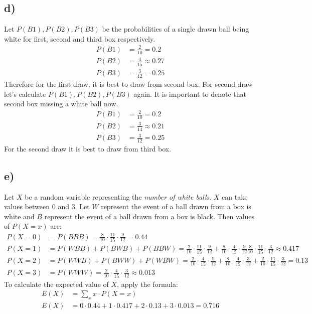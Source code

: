 \documentclass[12pt]{article}
\begin{document}
\subsection*{d)}
Let $P(B1), P(B2), P(B3)$ be the probabilities of a single drawn ball being white for first, second and third box respectively.
\begin{align*}
    P(B1) &= \frac{2}{10} = 0.2\\
    P(B2) &= \frac{4}{15} \approx 0.27\\
    P(B3) &= \frac{3}{12} = 0.25
\end{align*}
Therefore for the first draw, it is best to draw from second box. For second draw let's calculate $P(B1), P(B2), P(B3)$ again. It is important to denote that second box missing a white ball now.
\begin{align*}
    P(B1) &= \frac{2}{10} = 0.2\\
    P(B2) &= \frac{3}{14} \approx 0.21\\
    P(B3) &= \frac{3}{12} = 0.25
\end{align*}
For the second draw it is best to draw from third box. 
\subsection*{e)}
Let $X$ be a random variable representing the \emph{number of white balls}. $X$ can take values between $0$ and $3$. Let $W$ represent the event of a ball drawn from a box is white and $B$ represent the event of a ball drawn from a box is black. Then values of $P(X=x)$ are:
\begin{align*}
    P(X=0) &= P(BBB) = \frac{8}{10} \cdot \frac{11}{15} \cdot \frac{9}{12} = 0.44\\
    P(X=1) &= P(WBB) + P(BWB) + P(BBW) = \frac{2}{10} \cdot \frac{11}{15} \cdot \frac{9}{12} +
    \frac{8}{10} \cdot \frac{4}{15} \cdot \frac{9}{12}
    \frac{8}{10} \cdot \frac{11}{15} \cdot \frac{3}{12} \approx 0.417\\
    P(X=2) &= P(WWB) + P(BWW) + P(WBW) = \frac{2}{10} \cdot \frac{4}{15} \cdot \frac{9}{12} +
    \frac{8}{10} \cdot \frac{4}{15} \cdot \frac{3}{12} +
    \frac{2}{10} \cdot \frac{11}{15} \cdot \frac{3}{12} = 0.13\\
    P(X=3) &= P(WWW) = \frac{2}{10} \cdot \frac{4}{15} \cdot \frac{3}{12} \approx 0.013
\end{align*}
To calculate the expected value of $X$, apply the formula:
\begin{align*}
    E(X) &= \sum_{x}^{} x \cdot P(X=x)\\
    E(X) &= 0\cdot 0.44 + 1\cdot 0.417 + 2\cdot 0.13 + 3\cdot 0.013 = 0.716
\end{align*}
\end{document}
